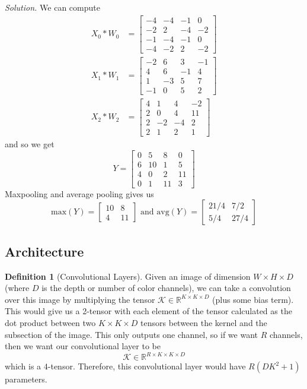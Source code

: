 \documentclass{article}
\theoremstyle{definition}
\theoremstyle{remark}
\theoremstyle{definition}
\newtheorem{definition}{Definition}[section]
\newenvironment{solution}{\noindent \textit{Solution.}}{}
\begin{document}
\begin{solution}
We can compute 
\begin{align*} 
    X_0 \ast  W_0 & = \begin{bmatrix} -4 & -4 & -1 & 0 \\ -2 & 2 & -4 & -2 \\ -1 & -4 & -1 & 0 \\ -4 & -2 & 2 & -2 \end{bmatrix} \\
    X_1 \ast W_1 & = \begin{bmatrix} -2 & 6 & 3 & -1 \\ 4 & 6 & -1 & 4 \\ 1 & -3 & 5 & 7 \\ -1 & 0 & 5 & 2 \end{bmatrix} \\
    X_2 \ast W_2 & = \begin{bmatrix} 4 & 1 & 4 & -2 \\ 2 & 0 & 4 & 11 \\ 2 & -2 & -4 & 2 \\ 2 & 1 & 2 & 1 \end{bmatrix}
\end{align*}
and so we get 
\[Y = \begin{bmatrix} 0 & 5 & 8 & 0 \\ 6 & 10 & 1 & 5 \\ 4 &  0 & 2 & 11 \\ 0 & 1 & 11 & 3 \end{bmatrix}\]
Maxpooling and average pooling gives us 
\[\mathrm{max}(Y) = \begin{bmatrix} 10 & 8 \\ 4 & 11 \end{bmatrix} \text{ and } \mathrm{avg}(Y) = \begin{bmatrix} 21/4 & 7/2 \\ 5/4 & 27/4 \end{bmatrix}\]
\end{solution}

\subsection{Architecture}

\begin{definition}[Convolutional Layers]
Given an image of dimension $W \times H \times D$ (where $D$ is the depth or number of color channels), we can take a convolution over this image by multiplying the tensor $\mathcal{K} \in \mathbb{R}^{K \times K \times D}$ (plus some bias term). This would give us a 2-tensor with each element of the tensor calculated as the dot product between two $K \times K \times D$ tensors between the kernel and the subsection of the image. This only outputs one channel, so if we want $R$ channels, then we want our convolutional layer to be 
\[\mathcal{K} \in \mathbb{R}^{R \times K \times K \times D}\]
which is a $4$-tensor. Therefore, this convolutional layer would have $R(DK^2 + 1)$ parameters. 
\end{definition} 
\end{document}
